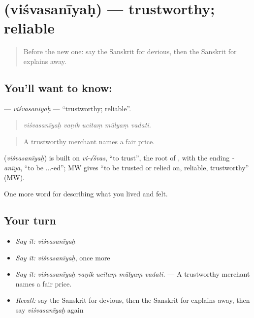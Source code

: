 \section[\texorpdfstring{\sk{विश्वसनीयः} (viśvasanīyaḥ)}{विश्वसनीयः (viśvasanīyaḥ)}]{ (viśvasanīyaḥ) — trustworthy; reliable}

\label{lesson:SA-C462-visvasaniyah}



\begin{quote}
Before the new one: say the Sanskrit for devious, then the Sanskrit for explains away.
\end{quote}

\subsection*{You'll want to know: }
\textbf{} — \emph{viśvasanīyaḥ} — \textquotedblleft{}trustworthy; reliable\textquotedblright{}.

\begin{quote}
    
\end{quote}

\begin{quote}
\emph{viśvasanīyaḥ vaṇik ucitaṃ mūlyaṃ vadati.}
\end{quote}

\begin{quote}
A trustworthy merchant names a fair price.
\end{quote}

\begin{cousinweb}
\textbf{} (\emph{viśvasanīyaḥ}) is built on \emph{vi-√śvas}, \textquotedblleft{}to trust\textquotedblright{}, the root of \textbf{}, with the ending \emph{-anīya}, \textquotedblleft{}to be ...-ed\textquotedblright{}; MW gives \textquotedblleft{}to be trusted or relied on, reliable, trustworthy\textquotedblright{} (MW).
\end{cousinweb}

\begin{grammarlens}[title={What you've built}]
One more word for describing what you lived and felt.
\end{grammarlens}

\subsection*{Your turn}
\begin{itemize}
\raggedright
  \item \emph{Say it:} \emph{viśvasanīyaḥ}
  \item \emph{Say it:} \emph{viśvasanīyaḥ}, once more
  \item \emph{Say it:} \emph{viśvasanīyaḥ vaṇik ucitaṃ mūlyaṃ vadati.} — A trustworthy merchant names a fair price.
  \item \emph{Recall:} say the Sanskrit for devious, then the Sanskrit for explains away, then say \emph{viśvasanīyaḥ} again
\end{itemize}

